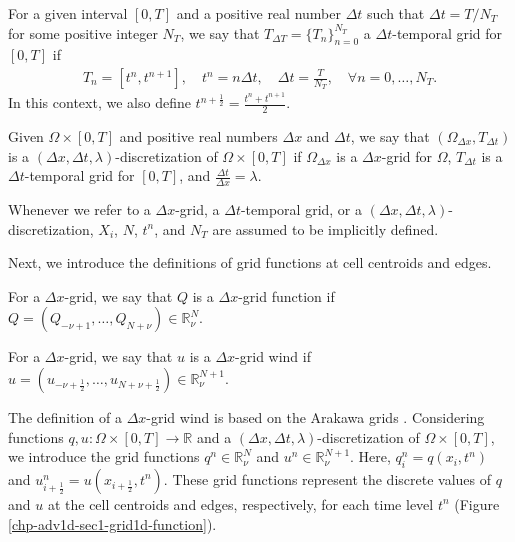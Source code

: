\begin{definition}
	For a given interval $[0,T]$ and a positive real number $\Delta t$ such that $\Delta t = T/N_T$
    for some positive integer $N_T$, we say that  $T_{\Delta T}= \{T_n\}_{n=0}^{N_T}$ a $\Delta t$-temporal grid for $[0,T]$ if
    \begin{align*}
	T_n = [t^n, t^{n+1}], \quad t^n = n\Delta t, \quad \Delta t = \frac{T}{N_T}, \quad \forall n = 0, \ldots, N_T.
    \end{align*}
    In this context, we also define $t^{n+\frac{1}{2}} = \frac{t^n+t^{n+1}}{2}$.
\end{definition}

\begin{definition}
\label{chp-adv1d-def-dxtimegrid}
	Given $\Omega \times [0,T]$ and positive real numbers $\Delta x$ and $\Delta t$,
    we say that $(\Omega_{\Delta x}, T_{\Delta t})$ is a $(\Delta x, \Delta t, \lambda)$-discretization 
    of $\Omega \times [0,T]$ if $\Omega_{\Delta x}$ is a $\Delta x$-grid for $\Omega$, 
    ${T}_{\Delta t}$ is a $\Delta t$-temporal grid for $[0,T]$, and $\frac{\Delta t}{\Delta x} = \lambda$.
\end{definition}
\begin{remark}
	Whenever we refer to a $\Delta x$-grid, a $\Delta t$-temporal grid, or a $(\Delta x, \Delta t, \lambda)$-discretization, 
	$X_i$, $N$, $t^n$, and $N_T$ are assumed to be implicitly defined.
\end{remark}
Next, we introduce the definitions of grid functions at cell centroids and edges.
\begin{definition}
	For a $\Delta x$-grid, we say that $Q$ is a $\Delta x$-grid function if
	$Q = (Q_{-\nu+1}, \ldots, Q_{N+\nu}) \in \mathbb{R}^{N}_{\nu}$.
\end{definition}
\begin{definition}
	For a $\Delta x$-grid, we say that $u$ is a $\Delta x$-grid wind if
	$u = (u_{-\nu+\frac{1}{2}}, \ldots, u_{N+\nu+\frac{1}{2}}) \in \mathbb{R}^{N+1}_{\nu}$.
\end{definition}
The definition of a $\Delta x$-grid wind is based on the Arakawa grids \citep{arakawa:1977}.
Considering functions $q, u: \Omega \times[0,T] \to \mathbb{R}$ and a $(\Delta x,\Delta t, \lambda)$-discretization
of $\Omega \times[0,T]$, we introduce the grid functions $q^n \in \mathbb{R}^{N}_{\nu}$ and $u^n \in \mathbb{R}^{N+1}_{\nu}$. 
Here, ${q}^n_{i} = {q}(x_i, t^{n})$ and $u^n_{i+\frac{1}{2}} = u(x_{i+\frac{1}{2}},t^n)$.
These grid functions represent the discrete values of $q$ and $u$ at the cell centroids and edges, respectively,
for each time level $t^n$  (Figure \ref{chp-adv1d-sec1-grid1d-function}).


